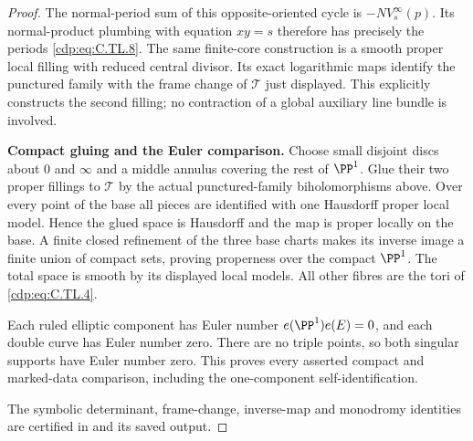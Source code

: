 \begin{proof}
The normal-period sum of this opposite-oriented cycle is
$-N V^\infty_s(p)$. Its normal-product plumbing with equation
$xy=s$ therefore has precisely the periods \eqref{cdp:eq:C.TL.8}.
The same finite-core construction is a smooth proper local
filling with reduced central divisor. Its exact logarithmic
maps identify the punctured family with the frame change of
$\mathcal T$ just displayed. This explicitly constructs the
second filling; no contraction of a global auxiliary line
bundle is involved.

\par\medskip\noindent\textbf{Compact gluing and the Euler comparison.}
Choose small disjoint discs about $0$ and $\infty$ and a middle
annulus covering the rest of $\PP^1$. Glue their two proper
fillings to $\mathcal T$ by the actual punctured-family
biholomorphisms above. Over every point of the base all pieces
are identified with one Hausdorff proper local model. Hence
the glued space is Hausdorff and the map is proper locally
on the base. A finite closed refinement of the three base
charts makes its inverse image a finite union of compact
sets, proving properness over the compact $\PP^1$.
The total space is smooth by its displayed local models.
All other fibres are the tori of \eqref{cdp:eq:C.TL.4}.

Each ruled elliptic component has Euler number
$e(\PP^1)e(E)=0$, and each double curve has Euler number zero.
There are no triple points, so both singular supports have
Euler number zero. This proves every asserted compact and
marked-data comparison, including the one-component
self-identification.

The symbolic determinant, frame-change, inverse-map and
monodromy identities are certified in
 and its saved output.
\end{proof}


